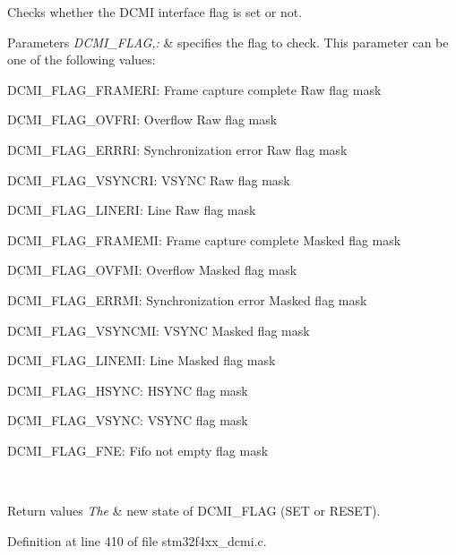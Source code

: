 Checks whether the D\-C\-M\-I interface flag is set or not. 


\begin{DoxyParams}{Parameters}
{\em D\-C\-M\-I\-\_\-\-F\-L\-A\-G,\-:} & specifies the flag to check. This parameter can be one of the following values\-: \begin{DoxyItemize}
\item D\-C\-M\-I\-\_\-\-F\-L\-A\-G\-\_\-\-F\-R\-A\-M\-E\-R\-I\-: Frame capture complete Raw flag mask \item D\-C\-M\-I\-\_\-\-F\-L\-A\-G\-\_\-\-O\-V\-F\-R\-I\-: Overflow Raw flag mask \item D\-C\-M\-I\-\_\-\-F\-L\-A\-G\-\_\-\-E\-R\-R\-R\-I\-: Synchronization error Raw flag mask \item D\-C\-M\-I\-\_\-\-F\-L\-A\-G\-\_\-\-V\-S\-Y\-N\-C\-R\-I\-: V\-S\-Y\-N\-C Raw flag mask \item D\-C\-M\-I\-\_\-\-F\-L\-A\-G\-\_\-\-L\-I\-N\-E\-R\-I\-: Line Raw flag mask \item D\-C\-M\-I\-\_\-\-F\-L\-A\-G\-\_\-\-F\-R\-A\-M\-E\-M\-I\-: Frame capture complete Masked flag mask \item D\-C\-M\-I\-\_\-\-F\-L\-A\-G\-\_\-\-O\-V\-F\-M\-I\-: Overflow Masked flag mask \item D\-C\-M\-I\-\_\-\-F\-L\-A\-G\-\_\-\-E\-R\-R\-M\-I\-: Synchronization error Masked flag mask \item D\-C\-M\-I\-\_\-\-F\-L\-A\-G\-\_\-\-V\-S\-Y\-N\-C\-M\-I\-: V\-S\-Y\-N\-C Masked flag mask \item D\-C\-M\-I\-\_\-\-F\-L\-A\-G\-\_\-\-L\-I\-N\-E\-M\-I\-: Line Masked flag mask \item D\-C\-M\-I\-\_\-\-F\-L\-A\-G\-\_\-\-H\-S\-Y\-N\-C\-: H\-S\-Y\-N\-C flag mask \item D\-C\-M\-I\-\_\-\-F\-L\-A\-G\-\_\-\-V\-S\-Y\-N\-C\-: V\-S\-Y\-N\-C flag mask \item D\-C\-M\-I\-\_\-\-F\-L\-A\-G\-\_\-\-F\-N\-E\-: Fifo not empty flag mask \end{DoxyItemize}
\\
\hline
\end{DoxyParams}

\begin{DoxyRetVals}{Return values}
{\em The} & new state of D\-C\-M\-I\-\_\-\-F\-L\-A\-G (S\-E\-T or R\-E\-S\-E\-T). \\
\hline
\end{DoxyRetVals}


Definition at line 410 of file stm32f4xx\-\_\-dcmi.\-c.

